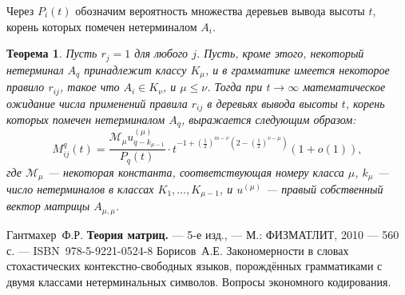 \documentclass{article}
\newtheorem{theorem}{Теорема}
\begin{document}
Через $P_i(t)$ обозначим вероятность множества деревьев вывода высоты $t$, корень которых помечен нетерминалом $A_i$.

\begin{theorem}
Пусть $r_j = 1$ для любого $j$. Пусть, кроме этого, некоторый нетерминал $A_q$ принадлежит классу $K_\mu$, и в грамматике имеется некоторое правило $r_{ij}$, такое что $A_i \in K_\nu$, и $\mu \leqslant \nu$. Тогда при $t \rightarrow \infty$ математическое ожидание числа применений правила $r_{ij}$ в деревьях вывода высоты $t$, корень которых помечен нетерминалом $A_q$, выражается следующим образом:
    \begin{equation}
        M^q_{ij}(t) = \frac{ \mathcal{M}_\mu u^{(\mu)}_{q - k_{\mu-1}} }{ P_q(t) } \cdot t^{-1 + \left( \frac{1}{2} \right)^{m - \nu} \left( 2 - \left( \frac{1}{2} \right)^{\nu - \mu} \right)} (1 + o(1)),
    \end{equation}
    где $\mathcal{M}_\mu$ --- некоторая константа, соответствующая номеру класса $\mu$, $k_\mu$ --- число нетерминалов в классах $K_1, \ldots, K_{\mu-1}$, и $u^{(\mu)}$ --- правый собственный вектор матрицы $A_{\mu,\mu}$.
\end{theorem}


\begin{thebibliography}{99}
        Гантмахер~Ф.Р. \textbf{Теория матриц.} --- 5-е изд., --- М.: ФИЗМАТЛИТ, 2010 --- 560 с. --- ISBN~978-5-9221-0524-8
        Борисов~А.Е. Закономерности в словах стохастических контекстно-свободных языков, порождённых грамматиками с двумя классами нетерминальных символов. Вопросы экономного кодирования.
\end{thebibliography}
\end{document}

